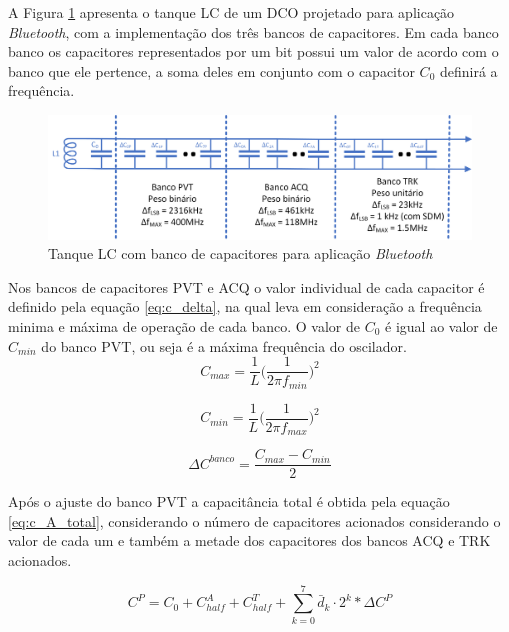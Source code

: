 A Figura \ref{fig:lc_bank_capacitor} apresenta o tanque LC de um DCO projetado para aplicação \textit{Bluetooth}, com a implementação dos três bancos de capacitores. Em cada banco banco os capacitores representados por um bit possui um valor de acordo com o banco que ele pertence, a soma deles em conjunto com o capacitor $C_0$ definirá a frequência. 

\begin{figure}[h!]
	\caption{Tanque LC com banco de capacitores para aplicação \textit{Bluetooth} }
	\begin{center}
		\includegraphics[scale=0.8]{img/lc_bank_capacitor.png}
	\end{center}
	\label{fig:lc_bank_capacitor}
\end{figure}


Nos bancos de capacitores PVT e ACQ o valor individual de cada capacitor é definido pela equação \ref{eq:c_delta}, na qual leva em consideração a frequência minima e máxima de operação de cada banco. O valor de $C_0$ é igual ao valor de $C_{min}$ do banco PVT, ou seja é a máxima frequência do oscilador.
\begin{equation}
	C_{max} = \frac{1}{L} \big( \frac{1}{2 \pi f_{min}} \big)^2
	\label{eq:cmax}
\end{equation}

\begin{equation}
	C_{min} = \frac{1}{L} \big( \frac{1}{2 \pi f_{max}} \big)^2
	\label{eq:cmin}
\end{equation}

\begin{equation}
	\Delta C^{banco} = \frac{	C_{max} - C_{min}}{2}
	\label{eq:c_delta}
\end{equation}

Após o ajuste do banco PVT a capacitância total é obtida pela equação \ref{eq:c_A_total}, considerando o número de capacitores acionados considerando o valor de cada um e também a metade dos capacitores dos bancos ACQ e TRK acionados.

\begin{equation}
	C^P = C_0 + C^A_{half} + C^T_{half} + \sum_{k=0}^{7} \bar{d}_k \cdot 2^k * 	\Delta C^P
	\label{eq:c_P_total}
\end{equation}

